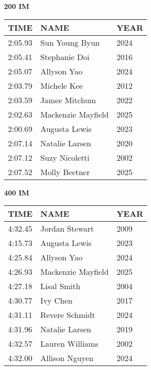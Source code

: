 \begin{minipage}[t]{0.48\textwidth}
\centering
\textbf{200 IM}\\[0.05cm]
\begin{tabular}{@{}p{1.8cm}p{2.8cm}p{1.2cm}@{}}
\hline
\textbf{TIME} & \textbf{NAME} & \textbf{YEAR} \\
\hline
2:05.93 & Sun Young Byun & 2024 \\
2:05.41 & Stephanie Doi & 2016 \\
2:05.07 & Allyson Yao & 2024 \\
2:03.79 & Michele Kee & 2012 \\
2:03.59 & Jamee Mitchum & 2022 \\
2:02.63 & Mackenzie Mayfield & 2025 \\
2:00.69 & Augusta Lewis & 2023 \\
2:07.14 & Natalie Larsen & 2020 \\
2:07.12 & Suzy Nicoletti & 2002 \\
2:07.52 & Molly Beetner & 2025 \\
\hline
\end{tabular}
\end{minipage}\hfill
\begin{minipage}[t]{0.48\textwidth}
\centering
\textbf{400 IM}\\[0.05cm]
\begin{tabular}{@{}p{1.8cm}p{2.8cm}p{1.2cm}@{}}
\hline
\textbf{TIME} & \textbf{NAME} & \textbf{YEAR} \\
\hline
4:32.45 & Jordan Stewart & 2009 \\
4:15.73 & Augusta Lewis & 2023 \\
4:25.84 & Allyson Yao & 2024 \\
4:26.93 & Mackenzie Mayfield & 2025 \\
4:27.18 & Lisal Smith & 2004 \\
4:30.77 & Ivy Chen & 2017 \\
4:31.11 & Revere Schmidt & 2024 \\
4:31.96 & Natalie Larsen & 2019 \\
4:32.57 & Lauren Williams & 2002 \\
4:32.00 & Allison Nguyen & 2024 \\
\hline
\end{tabular}
\end{minipage}

\vspace{0.4cm}

